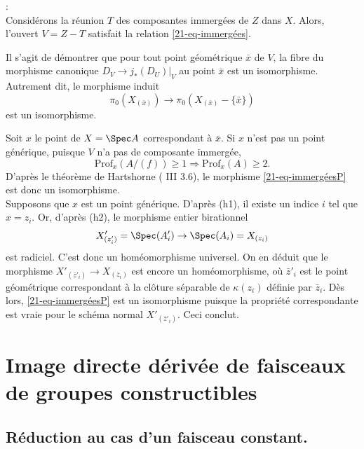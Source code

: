 \documentclass[10pt]{../fichiers-configuration-latex/smfart}
\begin{document}
: \\
Considérons la réunion $T$ des composantes immergées de $Z$ dans $X$.
Alors, l'ouvert $V=Z-T$ satisfait la relation \eqref{21-eq-immergées}.

Il s'agit de démontrer que pour tout point géométrique $\bar x$ de $V$,
 la fibre du morphisme canonique $D_V \rightarrow j_*(D_U)|_V$
 au point $\bar x$ est un isomorphisme.
Autrement dit, le morphisme induit
\begin{equation} \label{21-eq-immergéesP}
\pi_0(X_{(\bar x)}) \rightarrow \pi_0(X_{(\bar x)}-\{\bar x\})
\end{equation}
est un isomorphisme.

Soit $x$ le point de $X=\Spec A$ correspondant à $\bar x$.
Si $x$ n'est pas un point générique, 
puisque $V$ n'a pas de composante immergée,
$$
\mathrm{Prof}_x(A/(f)) \geq 1 \Rightarrow \mathrm{Prof}_x(A) \geq 2.
$$
D'après le théorème de Hartshorne ( {III} {3.6}),
 le morphisme \eqref{21-eq-immergéesP} est donc un isomorphisme. \\
Supposons que $x$ est un point générique. D'après (h1), il existe
un indice $i$ tel que $x=z_i$. Or, d'après (h2), le morphisme
entier birationnel
$$
X'_{(z'_i)}=\Spec(A'_i) \rightarrow \Spec(A_i)=X_{(z_i)}
$$
est radiciel. C'est donc un homéomorphisme universel.
On en déduit que le morphisme $X'_{(\bar z'_i)} \rightarrow X_{(\bar z_i)}$
est encore un homéomorphisme, où $\bar z'_i$ est le point géométrique
correspondant à la clôture séparable de $\kappa(z_i)$ définie par $\bar z_i$.
Dès lors, \eqref{21-eq-immergéesP} est un isomorphisme 
puisque la propriété correspondante est vraie
 pour le schéma normal $X'_{(\bar z'_i)}$. Ceci conclut.

\section{Image directe dérivée de faisceaux de groupes constructibles}
\label{21-sec-groupes}

\subsection{Réduction au cas d'un faisceau constant.}

\label{21-constant}
\end{document}
